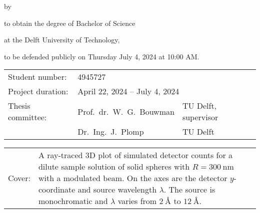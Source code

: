 \begin{titlepage}
	
	\begin{center}
		
		{\makeatletter
			\largetitlestyle\fontsize{45}{45}\selectfont\@title
			\makeatother}
		
		{\makeatletter
			\ifdefvoid{\@subtitle}{}{\bigskip\titlestyle\fontsize{20}{20}\selectfont\@subtitle}
			\makeatother}
		
		\bigskip
		\bigskip
		
		by
		
		\bigskip
		\bigskip
		
		{\makeatletter
			\largetitlestyle\fontsize{25}{25}\selectfont\@author
			\makeatother}
		
		\bigskip
		\bigskip
		
		to obtain the degree of Bachelor of Science
		
		at the Delft University of Technology,
		
		to be defended publicly on Thursday July 4, 2024 at 10:00 AM.
		
		\vfill
		
		\begin{tabular}{lll}
			Student number: & 4945727 \\
			Project duration: & \multicolumn{2}{l}{April 22, 2024 -- July 4, 2024} \\
			Thesis committee: & Prof.\ dr.\ W.\ G.\ Bouwman & TU Delft, supervisor \\
			& Dr.\ Ing.\ J.\ Plomp & TU Delft
		\end{tabular}
		
		\bigskip
		\bigskip
		
		\bigskip
		\bigskip
		\begin{tabular}{p{15mm}p{10cm}}
			Cover: & A ray-traced 3D plot of simulated detector counts for a dilute sample solution of solid spheres with $R = \SI{300}{\nano\meter}$ with a modulated beam. On the axes are the detector $y$-coordinate and source wavelength $\lambda$. The source is monochromatic and $\lambda$ varies from $\SI{2}{\angstrom}$ to $\SI{12}{\angstrom}$.\\
		\end{tabular}
		

\end{center}
\end{titlepage}
